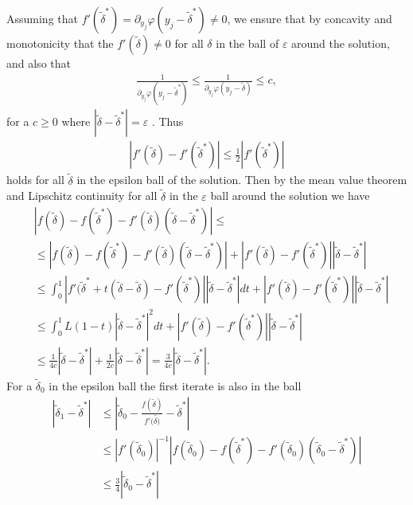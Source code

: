 Assuming that $f'(\tilde{\delta}^{*})=\partial_{y_j}\varphi(y_j -
\tilde{\delta}^{*}) \neq 0$, we ensure that by concavity and monotonicity
that the $f'(\tilde{\delta})\neq 0$ for all $\delta$ in the ball of
$\varepsilon$ around the solution, and also that
\begin{align}
    \frac{1}{\partial_{y_j}\varphi(y_j - \tilde{\delta}^{*})} \le
    \frac{1}{\partial_{y_j}\varphi(y_j - \tilde{\delta})} \le c,
\end{align}
for a $c\ge0$ where $|\tilde{\delta} - \tilde{\delta}^{*}| = \varepsilon$ . Thus
\begin{align}
    |f'(\tilde{\delta}) - f'(\tilde{\delta}^{*})| \le \frac{1}{2}
    |f'(\tilde{\delta}^{*})|
\end{align}
holds for all $\tilde{\delta}$ in the epsilon ball of the solution. Then by
the mean value theorem and Lipschitz continuity for all $\tilde{\delta}$ in
the $\varepsilon$ ball around the solution we have
\begin{align}
    &|f(\tilde{\delta}) - f(\tilde{\delta}^{*}) -
    f'(\tilde{\delta})(\tilde{\delta} - \tilde{\delta}^{*})| \le\\
    &\le |f(\tilde{\delta}) - f(\tilde{\delta}^{*}) -
    f'(\tilde{\delta})(\tilde{\delta} - \tilde{\delta}^{*})| +
    |f'(\tilde{\delta}) - f'(\tilde{\delta}^{*})|
    |\tilde{\delta}-\tilde{\delta}^{*} | \\
    &\le \int_{0}^{1} |f'(\tilde{\delta}^{*} + t(\tilde{\delta}
    -\tilde{\delta}) - f'(\tilde{\delta}^{*})| |\tilde{\delta} -
    \tilde{\delta}^{*} | dt
    +|f'(\tilde{\delta}) - f'(\tilde{\delta}^{*})|
    |\tilde{\delta}-\tilde{\delta}^{*} | \\
    &\le \int_0^1 L(1-t)
    |\tilde{\delta} - \tilde{\delta}^{*} |^{2}dt
    +|f'(\tilde{\delta}) - f'(\tilde{\delta}^{*})|
    |\tilde{\delta}-\tilde{\delta}^{*} | \\
    &\le \frac{1}{4c} |\tilde{\delta} - \tilde{\delta}^{*}| + \frac{1}{2c}
    |\tilde{\delta} - \tilde{\delta}^{*}| = \frac{3}{4c} |\tilde{\delta} -
    \tilde{\delta}^{*}|.
\end{align}
For a $\tilde{\delta}_0 $ in the epsilon ball the first iterate is also in
the ball
\begin{align}
    |\tilde{\delta}_{1} -\tilde{\delta}^{*} | &\le \left|\tilde{\delta}_0 -
    \frac{f(\tilde{\delta})}{f'(\tilde{\delta)}} - \tilde{\delta}^{*}
    \right| \\
    &\le |f'(\tilde{\delta}_0)|^{-1} |
    f(\tilde{\delta}_0) - f(\tilde{\delta}^{*}) -
    f'(\tilde{\delta}_0)(\tilde{\delta}_0 - \tilde{\delta}^{*})| \\
    &\le \frac{3}{4} |\tilde{\delta}_0-\tilde{\delta}^{*} |
\end{align}
